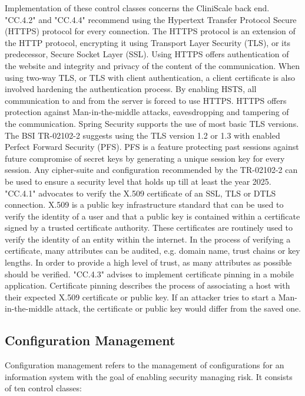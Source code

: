 Implementation of these control classes concerns the CliniScale back end. "CC.4.2" and "CC.4.4" recommend using the Hypertext Transfer Protocol Secure (HTTPS) protocol for every connection. The HTTPS protocol is an extension of the HTTP protocol, encrypting it using Transport Layer Security (TLS), or its predecessor, Secure Socket Layer (SSL). Using HTTPS offers authentication of the website and integrity and privacy of the content of the communication. When using two-way TLS, or TLS with client authentication, a client certificate is also involved hardening the authentication process. By enabling HSTS, all communication to and from the server is forced to use HTTPS. HTTPS offers protection against Man-in-the-middle attacks, eavesdropping and tampering of the communication. Spring Security supports the use of most basic TLS versions. The BSI TR-02102-2 suggests using the TLS version 1.2 or 1.3 with enabled Perfect Forward Security (PFS). PFS is a feature protecting past sessions against future compromise of secret keys by generating a unique session key for every session. Any cipher-suite and configuration recommended by the TR-02102-2 can be used to ensure a security level that holds up till at least the year 2025. "CC.4.1" advocates to verify the X.509 certificate of an SSL, TLS or DTLS connection. X.509 is a public key infrastructure standard that can be used to verify the identity of a user and that a public key is contained within a certificate signed by a trusted certificate authority. These certificates are routinely used to verify the identity of an entity within the internet. In the process of verifying a certificate, many attributes can be audited, e.g. domain name, trust chains or key lengths. In order to provide a high level of trust, as many attributes as possible should be verified. "CC.4.3" advises to implement certificate pinning in a mobile application. Certificate pinning describes the process of associating a host with their expected X.509 certificate or public key. If an attacker tries to start a Man-in-the-middle attack, the certificate or public key would differ from the saved one.

\subsection{Configuration Management}
Configuration management refers to the management of configurations for an information system with the goal of enabling security managing risk. It consists of ten control classes:

